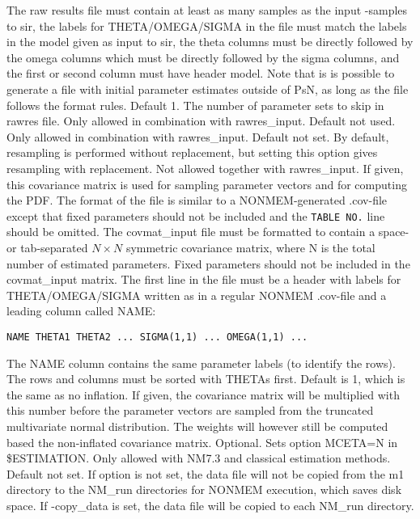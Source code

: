 \begin{optionlist}
The raw results file must contain at least as many 
samples as the input -samples to sir, the labels for  THETA/OMEGA/SIGMA 
in the file must match the labels in the model given as input 
to sir, the theta columns must be directly followed by the omega columns 
which must be directly followed by the sigma columns, and the first or
second column must have header model. Note that is is 
possible to generate a file with initial parameter estimates outside 
of PsN, as long as the file follows the format rules.
\nextopt
{}
Default 1. The number of parameter sets to skip in rawres file. Only allowed in combination with rawres\_input.
\nextopt
{}
Default not used. Only allowed in combination with rawres\_input.
\nextopt
{}
Default not set. By default, resampling is performed without replacement, but setting this option gives resampling with replacement.
\nextopt
{}
Not allowed together with rawres\_input. If given, this covariance matrix is
used for sampling parameter vectors and for computing the PDF. The format of the file is similar to a NONMEM-generated .cov-file except 
that fixed parameters should not be included and the \verb|TABLE NO.| line
should be omitted. 
The covmat\_input file must be formatted to contain a space- or tab-separated  $N\times N$ symmetric covariance matrix, 
where N is the total number of estimated parameters. Fixed parameters should not be included in the covmat\_input matrix. 
The first line in the file must be a header with labels for THETA/OMEGA/SIGMA written as in a regular NONMEM .cov-file 
and a leading column called NAME: 
\begin{verbatim}
NAME THETA1 THETA2 ... SIGMA(1,1) ... OMEGA(1,1) ... 
\end{verbatim}
The NAME column contains the same parameter labels (to identify the rows).
The rows and columns must be sorted with THETAs first.
\nextopt
{}
Default is 1, which is the same as no inflation. If given, the covariance
matrix will be multiplied with this number before the parameter vectors
are sampled from the truncated multivariate normal distribution.
The weights will however still be computed based the non-inflated covariance matrix. 
\nextopt
{}
Optional. Sets option MCETA=N in \$ESTIMATION. Only allowed with NM7.3 and classical estimation methods.
\nextopt
{}
Default not set. If option is not set, the data file will not be copied from the m1 directory to the NM\_run directories for NONMEM execution, which saves disk space. If -copy\_data is set, the data file will be copied to each NM\_run directory.
\nextopt
\end{optionlist}


